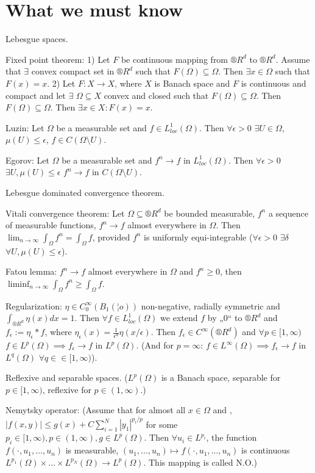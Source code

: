 \documentclass[12pt]{article}					%
\begin{document}
\section*{What we must know}
\begin{poznamka}
	Lebesgue spaces.

	Fixed point theorem: 1) Let $F$ be continuous mapping from $®R^d$ to $®R^d$. Assume that $\exists$ convex compact set in $®R^d$ such that $F(\Omega) \subseteq \Omega$. Then $\exists x \in \Omega$ such that $F(x) = x$. 2) Let $F: X \rightarrow X$, where $X$ is Banach space and $F$ is continuous and compact and let $\exists$ $\Omega \subseteq X$ convex and closed such that $F(\Omega) \subseteq \Omega$. Then $F(\Omega) \subseteq \Omega$. Then $\exists x \in X: F(x) = x$.

	Luzin: Let $\Omega$ be a measurable set and $f \in L_{loc}^1(\Omega)$. Then $\forall \epsilon > 0$ $\exists U \in \Omega$, $\mu(U) ≤ \epsilon$, $f \in C(\Omega \setminus U)$.

	Egorov: Let $\Omega$ be a measurable set and $f^n \rightarrow f$ in $L_{loc}^1(\Omega)$. Then $\forall \epsilon > 0$ $\exists U, \mu(U) ≤ \epsilon$ $f^n \rightarrow f$ in $C(\Omega \setminus U)$.

	Lebesgue dominated convergence theorem.

	Vitali convergence theorem: Let $\Omega \subseteq ®R^d$ be bounded measurable, $f^n$ a sequence of measurable functions, $f^n \rightarrow f$ almost everywhere in $\Omega$. Then $\lim_{n \rightarrow ∞} \int_\Omega f^n = \int_\Omega f$, provided $f^n$ is uniformly equi-integrable ($\forall \epsilon > 0$ $\exists \delta$ $\forall U, \mu(U) ≤ \epsilon$).

	Fatou lemma: $f^n \rightarrow f$ almost everywhere in $\Omega$ and $f^n ≥ 0$, then $\liminf_{n \rightarrow ∞} \int_\Omega f^n ≥ \int_\Omega f$.

	Regularization: $\eta \in C_0^∞(B_1(¦o))$ non-negative, radially symmetric and $\int_{®R^d} \eta(x) dx = 1$. Then $\forall f \in L_{loc}^1(\Omega)$ we extend $f$ by „0“ to $®R^d$ and $f_\epsilon := \eta_\epsilon * f$, where $\eta_\epsilon(x) = \frac{1}{\epsilon^d} \eta(x / \epsilon)$. Then $f_\epsilon \in C^∞(®R^d)$ and $\forall p \in [1, ∞)$ $f \in L^p(\Omega) \implies f_\epsilon \rightarrow f$ in $L^p(\Omega)$. (And for $p = ∞$: $f \in L^∞(\Omega) \implies f_\epsilon \rightarrow f$ in $L^q(\Omega)$ $\forall q \in \in [1, ∞)$).

	Reflexive and separable spaces. ($L^p(\Omega)$ is a Banach space, separable for $p \in [1, ∞)$, reflexive for $p \in (1, ∞)$.)

	Nemytsky operator: (Assume that for almost all $x \in \Omega$ and $ $, $|f(x, y)| ≤ g(x) + C \sum_{i=1}^N |y_1|^{p_i / p}$ for some $p_i \in [1, ∞), p \in (1, ∞), g \in L^p(\Omega)$. Then $\forall u_i \in L^{p_i}$, the function $f(·, u_1, …, u_n)$ is measurable, $(u_1, …, u_n) \mapsto f(·, u_1, …, u_n)$ is continuous $L^{p_1}(\Omega) \times … \times L^{p_N}(\Omega) \rightarrow L^p(\Omega)$. This mapping is called N.O.)
\end{poznamka}
\end{document}

